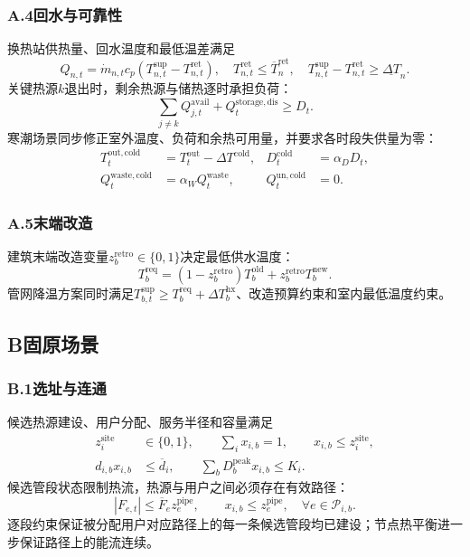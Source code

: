 \subsubsection*{A.4\quad 回水与可靠性}

换热站供热量、回水温度和最低温差满足
\begin{equation}
Q_{n,t}=\dot m_{n,t}c_p(T_{n,t}^{\mathrm{sup}}-T_{n,t}^{\mathrm{ret}}),
\quad T_{n,t}^{\mathrm{ret}}\leq\overline T_n^{\mathrm{ret}},
\quad T_{n,t}^{\mathrm{sup}}-T_{n,t}^{\mathrm{ret}}\geq\underline{\Delta T}_n.
\end{equation}
关键热源$k$退出时，剩余热源与储热逐时承担负荷：
\begin{equation}
\sum_{j\neq k}Q_{j,t}^{\mathrm{avail}}+Q_t^{\mathrm{storage,dis}}\geq D_t.
\end{equation}
寒潮场景同步修正室外温度、负荷和余热可用量，并要求各时段失供量为零：
\begin{align}
T_t^{\mathrm{out,cold}}&=T_t^{\mathrm{out}}-\Delta T^{\mathrm{cold}},
&D_t^{\mathrm{cold}}&=\alpha_DD_t,\\
Q_t^{\mathrm{waste,cold}}&=\alpha_WQ_t^{\mathrm{waste}},
&Q_t^{\mathrm{un,cold}}&=0.
\end{align}

\subsubsection*{A.5\quad 末端改造}

建筑末端改造变量$z_b^{\mathrm{retro}}\in\{0,1\}$决定最低供水温度：
\begin{equation}
T_b^{\mathrm{req}}=(1-z_b^{\mathrm{retro}})T_b^{\mathrm{old}}+z_b^{\mathrm{retro}}T_b^{\mathrm{new}}.
\end{equation}
管网降温方案同时满足$T_{b,t}^{\mathrm{sup}}\geq T_b^{\mathrm{req}}+\Delta T_b^{\mathrm{hx}}$、改造预算约束和室内最低温度约束。

\subsection*{B\quad 固原场景}

\subsubsection*{B.1\quad 选址与连通}

候选热源建设、用户分配、服务半径和容量满足
\begin{align}
z_i^{\mathrm{site}}&\in\{0,1\},\qquad
\sum_i x_{i,b}=1,\qquad x_{i,b}\leq z_i^{\mathrm{site}},\\
d_{i,b}x_{i,b}&\leq\overline d_i,\qquad
\sum_bD_b^{\mathrm{peak}}x_{i,b}\leq K_i.
\end{align}
候选管段状态限制热流，热源与用户之间必须存在有效路径：
\begin{equation}
|F_{e,t}|\leq\overline F_ez_e^{\mathrm{pipe}},
\qquad x_{i,b}\leq z_e^{\mathrm{pipe}},
\quad \forall e\in\mathcal P_{i,b}.
\end{equation}
逐段约束保证被分配用户对应路径上的每一条候选管段均已建设；节点热平衡进一步保证路径上的能流连续。

